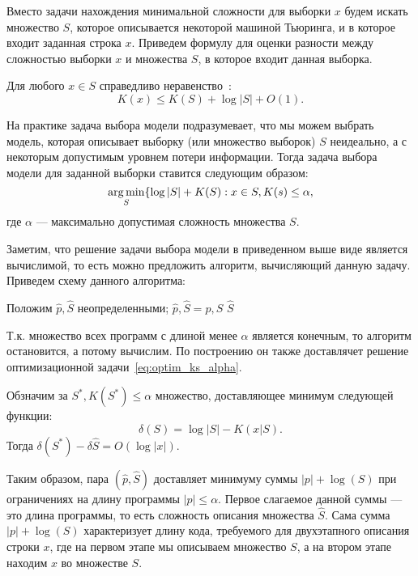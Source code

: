 \documentclass[../main.tex]{subfiles}
\begin{document}
Вместо задачи нахождения минимальной сложности для выборки $x$ будем искать множество $S$, которое описывается некоторой машиной Тьюринга, и в которое входит заданная строка $x$. Приведем формулу для оценки разности между сложностью выборки $x$ и множества $S$, в которое входит данная выборка.
\begin{theorembd}
Для любого $x \in S$ справедливо неравенство~\cite{ks_struct}:
\[
	K(x) \leq K(S)  + \log |S| + O(1).
\]
\end{theorembd}

На практике задача выбора модели подразумевает, что мы можем выбрать модель, которая описывает выборку (или множество выборок) $S$ неидеально, а с некоторым допустимым уровнем потери информации.
Тогда задача выбора модели для заданной выборки ставится следующим образом:
\begin{equation}
\label{eq:optim_ks_alpha}
	\operatorname*{arg\,min}_{S} \{\log|S| + K(S): x \in S, K(s) \leq \alpha,
\end{equation}
где $\alpha$ --- максимально допустимая сложность множества $S$.

Заметим, что решение задачи выбора модели в приведенном выше виде является вычислимой, то есть можно предложить алгоритм, вычисляющий данную задачу. Приведем схему данного алгоритма:
\begin{algorithmic}
\STATE Положим $\hat{p}, \hat{S}$ неопределенными;
\STATE  $\hat{p}, \hat{S} = p, S$
\ENDIF
\ENDFOR
\RETURN $\hat{S}$

\end{algorithmic}

Т.к. множество всех программ с длиной менее $\alpha$ является конечным, то алгоритм остановится, а потому вычислим. По построению он также доставлячет решение оптимизационной задачи~\eqref{eq:optim_ks_alpha}.

\begin{theorembd}
Обзначим за $S^{*}, K(S^{*}) \leq \alpha$  множество, доставляющее минимум следующей функции:
\[
    \delta(S) = \log{|S|} - K(x|S).
\]
Тогда  $\delta(S^{*}) - \delta{\hat{S}} = O(\log |x|).$
\end{theorembd}

Таким образом, пара $(\hat{p}, \hat{S})$ доставляет минимуму суммы $|p| + \log(S)$ при ограничениях на длину программы $|p| \leq \alpha$. Первое слагаемое данной суммы --- это длина  программы, то есть сложность описания множества $\hat{S}$. Сама сумма $|p| + \log(S)$ характеризует длину кода, требуемого для двухэтапного описания строки $x$, где на первом этапе мы описываем множество $S$, а на втором этапе находим $x$ во множестве $S$.
\end{document}
